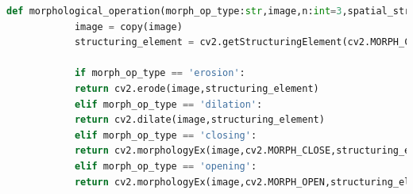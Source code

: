 	\begin{lstlisting}[language=Python]
		def morphological_operation(morph_op_type:str,image,n:int=3,spatial_structure:str='rect',**kargs):
			image = copy(image)
			structuring_element = cv2.getStructuringElement(cv2.MORPH_CROSS if spatial_structure == 'cross' else cv2.MORPH_RECT,(n,n))
			
			if morph_op_type == 'erosion':
			return cv2.erode(image,structuring_element)
			elif morph_op_type == 'dilation':
			return cv2.dilate(image,structuring_element)
			elif morph_op_type == 'closing':
			return cv2.morphologyEx(image,cv2.MORPH_CLOSE,structuring_element)
			elif morph_op_type == 'opening':
			return cv2.morphologyEx(image,cv2.MORPH_OPEN,structuring_element)
	\end{lstlisting}
